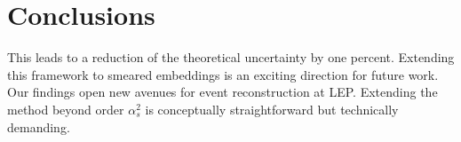 \section{Conclusions}\label{sec:conclusions}

This leads to a reduction of the theoretical uncertainty by one percent.
Extending this framework to smeared embeddings is an exciting direction
for future work. Our findings open new avenues for event reconstruction
at LEP. Extending the method beyond order $\alpha_s^2$ is conceptually
straightforward but technically demanding.

